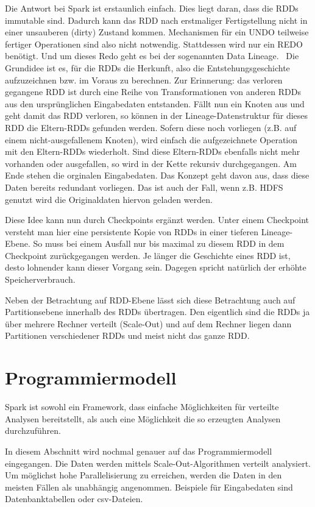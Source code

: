 \documentclass[letterpaper]{article}
\begin{document}
Die Antwort bei Spark ist erstaunlich einfach. Dies liegt daran, dass
die RDDs immutable sind. Dadurch kann das RDD nach erstmaliger
Fertigstellung nicht in einer unsauberen (dirty) Zustand kommen.
Mechanismen für ein UNDO teilweise fertiger Operationen sind also nicht
notwendig. Stattdessen wird nur ein REDO benötigt. Und um dieses Redo
geht es bei der sogenannten Data Lineage. \ Die Grundidee ist es, für
die RDDs die Herkunft, also die Entstehungsgeschichte aufzuzeichnen
bzw. im Voraus zu berechnen. Zur Erinnerung: das verloren gegangene RDD
ist durch eine Reihe von Transformationen von anderen RDDs aus den
ursprünglichen Eingabedaten entstanden. Fällt nun ein Knoten aus und
geht damit das RDD verloren, so können in der Lineage-Datenstruktur für
dieses RDD die Eltern-RDDs gefunden werden. Sofern diese noch vorliegen
(z.B. auf einem nicht-ausgefallenem Knoten), wird einfach die
aufgezeichnete Operation mit den Eltern-RDDs wiederholt. Sind diese
Eltern-RDDs ebenfalls nicht mehr vorhanden oder ausgefallen, so wird in
der Kette rekursiv durchgegangen. Am Ende stehen die orginalen
Eingabedaten. Das Konzept geht davon aus, dass diese Daten bereits
redundant vorliegen. Das ist auch der Fall, wenn z.B. HDFS genutzt wird
die Originaldaten hiervon geladen werden.

Diese Idee kann nun durch Checkpoints ergänzt werden. Unter einem
Checkpoint versteht man hier eine persistente Kopie von RDDs in einer
tieferen Lineage-Ebene. So muss bei einem Ausfall nur bis maximal zu
diesem RDD in dem Checkpoint zurückgegangen werden. Je länger die
Geschichte eines RDD ist, desto lohnender kann dieser Vorgang sein.
Dagegen spricht natürlich der erhöhte Speicherverbrauch.

Neben der Betrachtung auf RDD-Ebene lässt sich diese Betrachtung auch
auf Partitionsebene innerhalb des RDDs übertragen. Den eigentlich sind
die RDDs ja über mehrere Rechner verteilt (Scale-Out) und auf dem
Rechner liegen dann Partitionen verschiedener RDDs und meist nicht das
ganze RDD.

\section[Programmiermodell]{\rmfamily
Programmiermodell}
Spark ist sowohl ein Framework, dass einfache Möglichkeiten für
verteilte Analysen bereitstellt, als auch eine Möglichkeit die so
erzeugten Analysen durchzuführen.

In diesem Abschnitt wird nochmal genauer auf das Programmiermodell
eingegangen. Die Daten werden mittels Scale-Out-Algorithmen verteilt
analysiert. Um möglichst hohe Parallelisierung zu erreichen, werden die
Daten in den meisten Fällen als unabhängig angenommen. Beispiele für
Eingabedaten sind Datenbanktabellen oder csv-Dateien.
\end{document}
